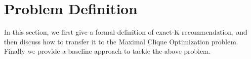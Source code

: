 \section{Problem Definition}
In this section, we first give a formal definition of exact-K recommendation, and then discuss how to transfer it to the Maximal Clique Optimization problem. Finally we provide a baseline approach to tackle the above problem.
%
